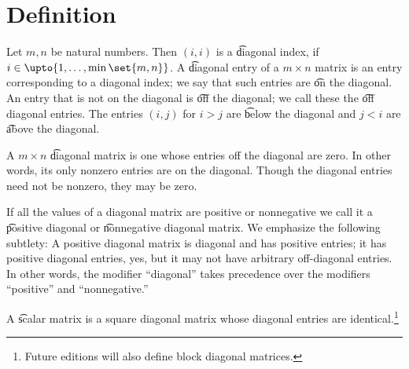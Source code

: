 

\section*{Definition}

Let $m, n$ be natural numbers.
Then $(i, i)$ is a \t{diagonal index}, if $i \in \upto{1, \dots , \min\set{m, n}}$.
A \t{diagonal entry} of a $m \times n$ matrix is an entry corresponding to a diagonal index; we say that such entries are \t{on the diagonal}.
An entry that is not on the diagonal is \t{off the diagonal}; we call these the \t{off diagonal entries}.
The entries $(i, j)$ for $i > j$ are \t{below the diagonal} and $j < i$ are \t{above the diagonal}.

A $m \times n$ \t{diagonal} matrix is one whose entries off the diagonal are zero.
In other words, its only nonzero entries are on the diagonal.
Though the diagonal entries need not be nonzero, they may be zero.

If all the values of a diagonal matrix are positive or nonnegative we call it a \t{positive diagonal} or \t{nonnegative diagonal} matrix.
We emphasize the following subtlety: A positive diagonal matrix is diagonal and has positive entries; it has positive diagonal entries, yes, but it may not have arbitrary off-diagonal entries.
In other words, the modifier ``diagonal'' takes precedence over the modifiers ``positive'' and ``nonnegative.''

A \t{scalar matrix} is a square diagonal matrix whose diagonal entries are identical.\footnote{Future editions will also define block diagonal matrices.}

\blankpage